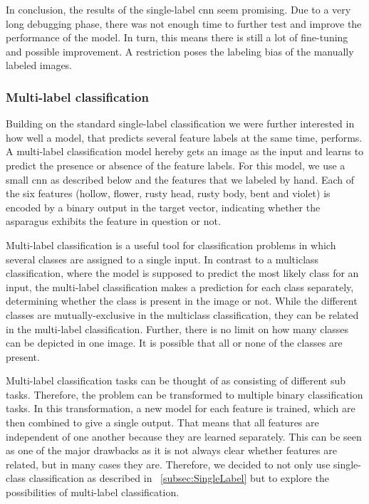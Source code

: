 \bigskip
In conclusion, the results of the single-label  \acrshort{cnn} seem promising. Due to a very long debugging phase, there was not enough time to further test and improve the performance of the model. In turn, this means there is still a lot of fine-tuning and possible improvement. A restriction poses the labeling bias of the manually labeled images.

\subsubsection{Multi-label classification}
\label{subsec:MultiLabel}

Building on the standard single-label classification we were further interested in how well a model, that predicts several feature labels at the same time, performs. A multi-label classification model hereby gets an image as the input and learns to predict the presence or absence of  the feature labels.
For this model, we use a small  \acrshort{cnn} as described below and the features that we labeled by hand. Each of the six features (hollow, flower, rusty head, rusty body, bent and violet) is encoded by a binary output in the target vector, indicating whether the asparagus exhibits the feature in question or not.

\bigskip
Multi-label classification is a useful tool for classification problems in which several classes are assigned to a single input. In contrast to a multiclass classification, where the model is supposed to predict the most likely class for an input, the multi-label classification makes a prediction for each class separately, determining whether the class is present in the image or not. While the different classes are mutually-exclusive in the multiclass classification, they can be related in the multi-label classification. Further, there is no limit on how many classes can be depicted in one image. It is possible that all or none of the classes are present.

Multi-label classification tasks can be thought of as consisting of different sub tasks. Therefore, the problem can be transformed to multiple binary classification tasks. In this transformation, a new model for each feature is trained, which are then combined to give a single output. That means that all features are independent of one another because they are learned separately. This can be seen as one of the major drawbacks as it is not always clear whether features are related, but in many cases they are.
Therefore, we decided to not only use single-class classification as described in ~\autoref{subsec:SingleLabel} but to explore the possibilities of multi-label classification.

